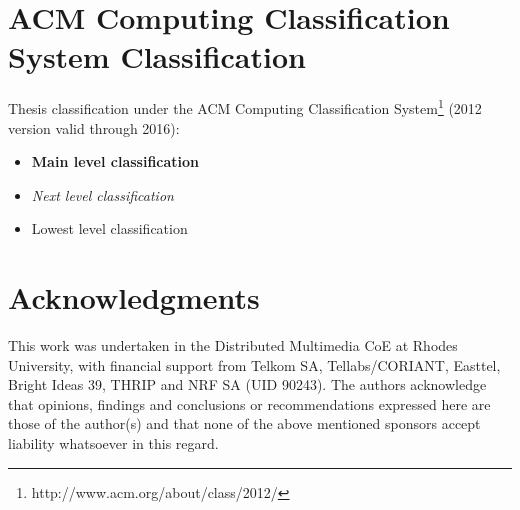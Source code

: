 \chapter*{ACM Computing Classification System Classification}
Thesis classification under the ACM Computing Classification System\footnote{http://www.acm.org/about/class/2012/} (2012 version valid through 2016):

\begin{itemize}
\item {\bf Main level classification}
\item {\em Next level classification}
\item Lowest level classification

\end{itemize}

\chapter*{Acknowledgments}
This work was undertaken in the Distributed Multimedia CoE at Rhodes University, with financial support from Telkom SA, Tellabs/CORIANT, Easttel, Bright Ideas 39, THRIP and NRF SA (UID 90243).  The authors acknowledge that opinions, findings and conclusions or recommendations expressed here are those of the author(s) and that none of the above mentioned sponsors accept liability whatsoever in this regard.